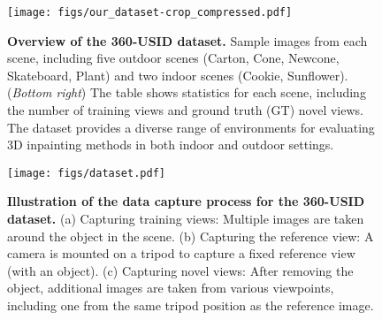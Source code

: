 

\begin{figure*}[t]
    \centering
    \texttt{[image: figs/our\_dataset-crop\_compressed.pdf]}
    \vspace{-6mm}
    \caption{\textbf{Overview of the 360-USID dataset.} Sample images from each scene, including five outdoor scenes (Carton, Cone, Newcone, Skateboard, Plant) and two indoor scenes (Cookie, Sunflower). (\emph{Bottom right}) The table shows statistics for each scene, including the number of training views and ground truth (GT) novel views. The dataset provides a diverse range of environments for evaluating 3D inpainting methods in both indoor and outdoor settings.}
    \label{fig:our_dataset}
    \vspace{-3mm}
\end{figure*}

\begin{figure}[t]
    \centering
    \texttt{[image: figs/dataset.pdf]}
    \vspace{-6mm}
    \caption{\textbf{Illustration of the data capture process for the 360-USID dataset.} (a) Capturing training views: Multiple images are taken around the object in the scene. (b) Capturing the reference view: A camera is mounted on a tripod to capture a fixed reference view (with an object). (c) Capturing novel views: After removing the object, additional images are taken from various viewpoints, including one from the same tripod position as the reference image.}
    \label{fig:dataset_capture}
\end{figure}


